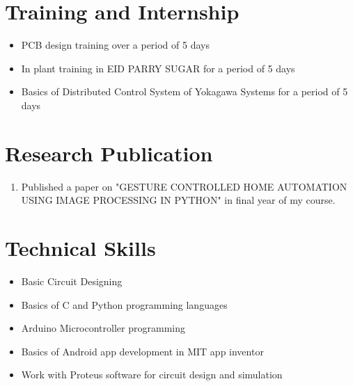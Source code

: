 \documentclass[a4paper,12pt,line]{article}
\begin{document}
	\hspace{-1.9cm}
	\newpage%
	\hspace*{-19mm}
		
		
	
	\section*{{\color{magenta}Training and Internship}}
	\begin{itemize}
		\item PCB design training over a period of 5 days
		\item In plant training in EID PARRY SUGAR for a period of 5 days
		\item Basics of Distributed Control System of Yokagawa Systems for a period of 5 days
		
	\end{itemize}
		
	
	\section*{{\color{magenta}Research Publication}}
	
	\begin{enumerate}
		\item Published a paper on "GESTURE CONTROLLED HOME AUTOMATION USING IMAGE PROCESSING IN PYTHON" in final year of my course.
	\end{enumerate}
	
	
	\section*{{\color{magenta}Technical Skills}}
	\begin{itemize}
		\item Basic Circuit Designing
		\item Basics of C and Python programming languages
		\item Arduino Microcontroller programming
		\item Basics of Android app development in MIT app inventor
		\item Work with Proteus software for circuit design and simulation
	\end{itemize}
	
\end{document}
